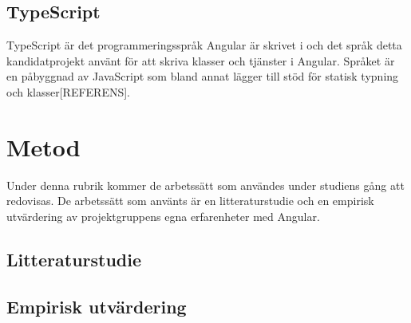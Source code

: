 \subsection{TypeScript}

TypeScript är det programmeringsspråk Angular är skrivet i och det språk detta kandidatprojekt använt för att skriva klasser och tjänster i Angular. Språket är en påbyggnad av JavaScript som bland annat lägger till stöd för statisk typning och klasser[REFERENS].

\section{Metod}

Under denna rubrik kommer de arbetssätt som användes under studiens gång att redovisas. De arbetssätt som använts är en litteraturstudie och en empirisk utvärdering av projektgruppens egna erfarenheter med Angular. 

\subsection{Litteraturstudie}

\subsection{Empirisk utvärdering} 
